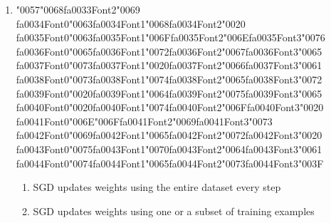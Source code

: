 \documentclass[12pt]{article}
\begin{document}
\begin{enumerate}[label=Q\arabic*.]
\begin{enumerate}[label=(\Alph*)]
    \item It improves cosine similarity
    \item It reduces dimensionality
    \item It avoids zero probabilities for unseen words
    \item It speeds up gradient descent
\end{enumerate}
\item {\char"0057}{\char"0068}{\csname fa0033Font2\endcsname\char"0069} {\csname fa0034Font0\endcsname\char"0063}{\csname fa0034Font1\endcsname\char"0068}{\csname fa0034Font2\endcsname\char"0020} {\csname fa0035Font0\endcsname\char"0063}{\csname fa0035Font1\endcsname\char"006F}{\csname fa0035Font2\endcsname\char"006E}{\csname fa0035Font3\endcsname\char"0076} {\csname fa0036Font0\endcsname\char"0065}{\csname fa0036Font1\endcsname\char"0072}{\csname fa0036Font2\endcsname\char"0067}{\csname fa0036Font3\endcsname\char"0065} {\csname fa0037Font0\endcsname\char"0073}{\csname fa0037Font1\endcsname\char"0020}{\csname fa0037Font2\endcsname\char"0066}{\csname fa0037Font3\endcsname\char"0061} {\csname fa0038Font0\endcsname\char"0073}{\csname fa0038Font1\endcsname\char"0074}{\csname fa0038Font2\endcsname\char"0065}{\csname fa0038Font3\endcsname\char"0072} {\csname fa0039Font0\endcsname\char"0020}{\csname fa0039Font1\endcsname\char"0064}{\csname fa0039Font2\endcsname\char"0075}{\csname fa0039Font3\endcsname\char"0065} {\csname fa0040Font0\endcsname\char"0020}{\csname fa0040Font1\endcsname\char"0074}{\csname fa0040Font2\endcsname\char"006F}{\csname fa0040Font3\endcsname\char"0020} {\csname fa0041Font0\endcsname\char"006E}{\char"006F}{\csname fa0041Font2\endcsname\char"0069}{\csname fa0041Font3\endcsname\char"0073} {\csname fa0042Font0\endcsname\char"0069}{\csname fa0042Font1\endcsname\char"0065}{\csname fa0042Font2\endcsname\char"0072}{\csname fa0042Font3\endcsname\char"0020} {\csname fa0043Font0\endcsname\char"0075}{\csname fa0043Font1\endcsname\char"0070}{\csname fa0043Font2\endcsname\char"0064}{\csname fa0043Font3\endcsname\char"0061} {\csname fa0044Font0\endcsname\char"0074}{\csname fa0044Font1\endcsname\char"0065}{\csname fa0044Font2\endcsname\char"0073}{\csname fa0044Font3\endcsname\char"003F}
\begin{enumerate}[label=(\Alph*)]
    \item SGD updates weights using the entire dataset every step
    \item SGD updates weights using one or a subset of training examples

\end{enumerate}
\end{enumerate}
\end{document}
